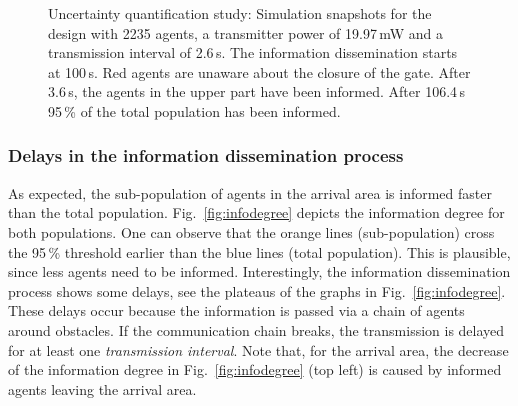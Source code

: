 \begin{figure}[hbt!]
\caption[Uncertainty quantification study: Simulation snapshots ]{ Uncertainty quantification study: Simulation snapshots for the design with 2235 agents, a transmitter power of 19.97\,mW and a transmission interval of 2.6\,s. The information dissemination starts at 100\,s. Red agents are unaware about the closure of the gate. After 3.6\,s, the agents in the upper part have been informed. After 106.4\,s 95\,\% of the total population has been informed. }
\label{fig:snapshots}
\end{figure}


\subsubsection{Delays in the information dissemination process}
As expected, the sub-population of agents in the arrival area is informed faster than the total population. Fig.~\ref{fig:infodegree} depicts the information degree for both populations. One can observe that the orange lines (sub-population) cross the 95\,\% threshold earlier than the blue lines (total population). This is plausible, since less agents need to be informed. Interestingly, the information dissemination process shows some delays, see the  plateaus of the graphs in Fig.~\ref{fig:infodegree}. These delays occur because the information is passed via a chain of agents around obstacles. If the communication chain breaks, the transmission is delayed for at least one \textit{transmission interval}. Note that, for the arrival area, the decrease of the information degree in Fig.~\ref{fig:infodegree} (top left) is caused by informed agents leaving the arrival area. 



